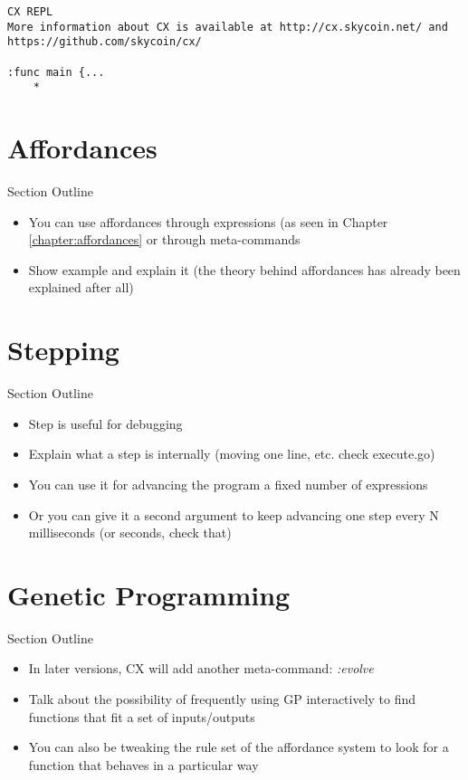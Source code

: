 \documentclass[11pt,fleqn,openany]{book} %
\begin{document}
\begin{lstlisting}[caption={Using Genetic Programming to Evolve a Function},captionpos=b,label={listing:genetic-programming-example}]
CX REPL
More information about CX is available at http://cx.skycoin.net/ and https://github.com/skycoin/cx/

:func main {...
	* 
\end{lstlisting}

\section{Affordances}

\begin{remark}
Section Outline
    \begin{itemize}
    	\item You can use affordances through expressions (as seen in Chapter \ref{chapter:affordances} or through meta-commands
        \item Show example and explain it (the theory behind affordances has already been explained after all)
    \end{itemize}
\end{remark}

\section{Stepping}

\begin{remark}
Section Outline
    \begin{itemize}
    	\item Step is useful for debugging
        \item Explain what a step is internally (moving one line, etc. check execute.go)
        \item You can use it for advancing the program a fixed number of expressions
        \item Or you can give it a second argument to keep advancing one step every N milliseconds (or seconds, check that)
    \end{itemize}
\end{remark}

\section{Genetic Programming}

\begin{remark}
Section Outline
    \begin{itemize}
    \item In later versions, CX will add another meta-command: \textit{:evolve}
    	\item Talk about the possibility of frequently using GP interactively to find functions that fit a set of inputs/outputs
        \item You can also be tweaking the rule set of the affordance system to look for a function that behaves in a particular way
    \end{itemize}
\end{remark}
\end{document}
